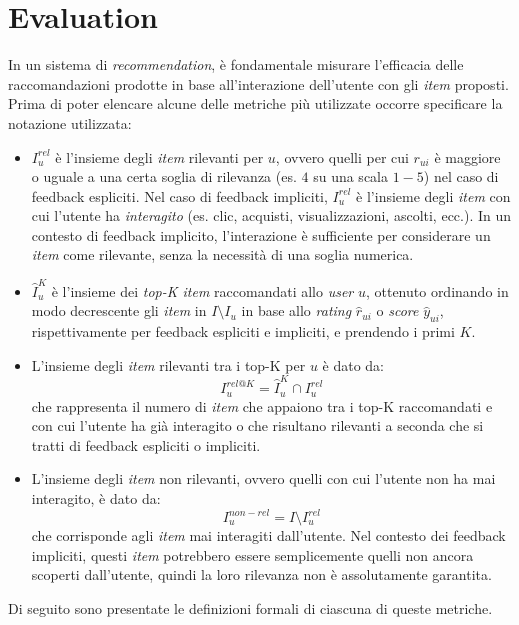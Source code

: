 \section{Evaluation}\label{evaluation}

In un sistema di \textit{recommendation}, è fondamentale misurare l'efficacia delle raccomandazioni prodotte in base all'interazione dell'utente con gli \textit{item} proposti. Prima di poter elencare alcune delle metriche più utilizzate occorre specificare la notazione utilizzata:

\begin{itemize}
    \item $I_u^{rel}$ è l'insieme degli \textit{item} rilevanti per $u$, ovvero quelli per cui $r_{ui}$ è maggiore o uguale a una certa soglia di rilevanza (es. $4$ su una scala $1-5$) nel caso di feedback espliciti. Nel caso di feedback impliciti, $I_u^{rel}$ è l'insieme degli \textit{item} con cui l'utente ha \textit{interagito} (es. clic, acquisti, visualizzazioni, ascolti, ecc.). In un contesto di feedback implicito, l'interazione è sufficiente per considerare un \textit{item} come rilevante, senza la necessità di una soglia numerica.
    \item $\hat{I}_u^K$ è l'insieme dei \textit{top-K item} raccomandati allo \textit{user} $u$, ottenuto ordinando in modo decrescente gli \textit{item} in $I \setminus I_u$ in base allo \textit{rating} $\hat{r}_{ui}$ o \textit{score} $\hat{y}_{ui}$, rispettivamente per feedback espliciti e impliciti, e prendendo i primi $K$.
    \item L'insieme degli \textit{item} rilevanti tra i top-K per $u$ è dato da:
    \[
    I_u^{rel@K} = \hat{I}_u^K \cap I_u^{rel}
    \]
    che rappresenta il numero di \textit{item} che appaiono tra i top-K raccomandati e con cui l'utente ha già interagito o che risultano rilevanti a seconda che si tratti di feedback espliciti o impliciti.
    \item L'insieme degli \textit{item} non rilevanti, ovvero quelli con cui l'utente non ha mai interagito, è dato da:
    \[
    I_u^{non-rel} = I \setminus I_u^{rel}
    \]
    che corrisponde agli \textit{item} mai interagiti dall'utente. Nel contesto dei feedback impliciti, questi \textit{item} potrebbero essere semplicemente quelli non ancora scoperti dall'utente, quindi la loro rilevanza non è assolutamente garantita.
\end{itemize}




Di seguito sono presentate le definizioni formali di ciascuna di queste metriche.

